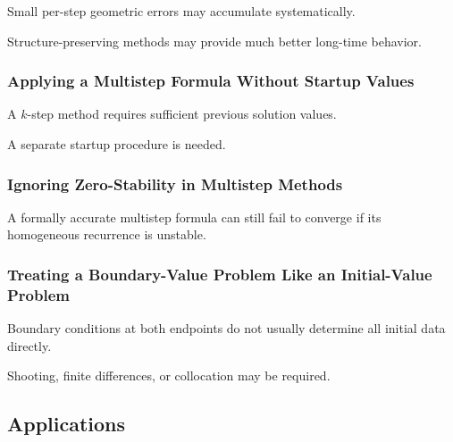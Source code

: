 Small per-step geometric errors may accumulate systematically.

Structure-preserving methods may provide much better long-time behavior.

\subsubsection{Applying a Multistep Formula Without Startup Values}

A \(k\)-step method requires sufficient previous solution values.

A separate startup procedure is needed.

\subsubsection{Ignoring Zero-Stability in Multistep Methods}

A formally accurate multistep formula can still fail to converge if its
homogeneous recurrence is unstable.

\subsubsection{Treating a Boundary-Value Problem Like an Initial-Value Problem}

Boundary conditions at both endpoints do not usually determine all initial
data directly.

Shooting, finite differences, or collocation may be required.

\subsection{Applications}
\label{subsec:numerical-ode-applications}

